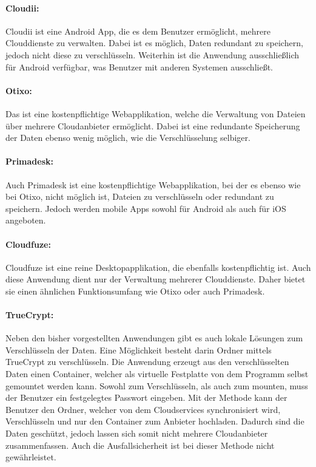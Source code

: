 \paragraph{Cloudii:}
Cloudii ist eine Android \ac{App}, die es dem Benutzer ermöglicht, mehrere Clouddienste zu verwalten.
Dabei ist es möglich, Daten redundant zu speichern, jedoch nicht diese zu verschlüsseln.
Weiterhin ist die Anwendung ausschließlich für Android verfügbar, was Benutzer mit anderen Systemen ausschließt.

\paragraph{Otixo:}
Das ist eine kostenpflichtige Webapplikation, welche die Verwaltung von Dateien über mehrere Cloudanbieter ermöglicht.
Dabei ist eine redundante Speicherung der Daten ebenso wenig möglich, wie die Verschlüsselung selbiger.

\paragraph{Primadesk:}
Auch Primadesk ist eine kostenpflichtige Webapplikation, bei der es ebenso wie bei Otixo, nicht möglich ist, Dateien zu verschlüsseln oder redundant zu speichern.
Jedoch werden mobile \acp{App} sowohl für Android als auch für iOS angeboten.

\paragraph{Cloudfuze:}
Cloudfuze ist eine reine Desktopapplikation, die ebenfalls kostenpflichtig ist.
Auch diese Anwendung dient nur der Verwaltung mehrerer Clouddienste.
Daher bietet sie einen ähnlichen Funktionsumfang wie Otixo oder auch Primadesk.

\paragraph{TrueCrypt:}
Neben den bisher vorgestellten Anwendungen gibt es auch lokale Lösungen zum Verschlüsseln der Daten.
Eine Möglichkeit besteht darin Ordner mittels TrueCrypt zu verschlüsseln.
Die Anwendung erzeugt aus den verschlüsselten Daten einen Container, welcher als virtuelle Festplatte von dem Programm selbst gemountet werden kann.
Sowohl zum Verschlüsseln, als auch zum mounten, muss der Benutzer ein festgelegtes Passwort eingeben.
Mit der Methode kann der Benutzer den Ordner, welcher von dem Cloudservices synchronisiert wird, Verschlüsseln und nur den Container zum Anbieter hochladen.
Dadurch sind die Daten geschützt, jedoch lassen sich somit nicht mehrere Cloudanbieter zusammenfassen.
Auch die Ausfallsicherheit ist bei dieser Methode nicht gewährleistet.


